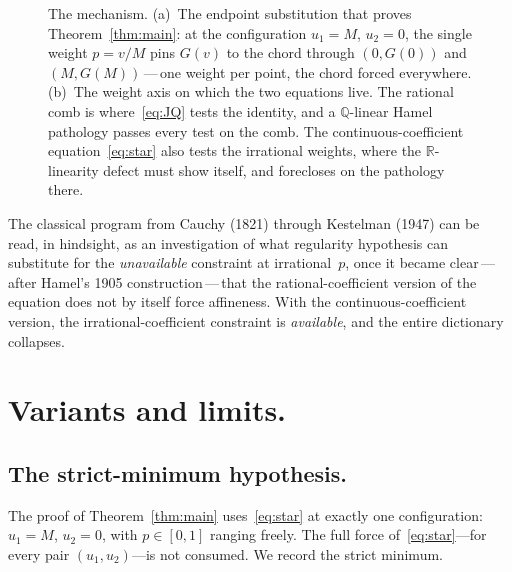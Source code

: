\documentclass{article}
\theoremstyle{plain}
\theoremstyle{definition}
\newcommand{\R}{\mathbb{R}}
\newcommand{\Q}{\mathbb{Q}}
\begin{document}
\begin{figure}[ht]
\caption{The mechanism. (a)~The endpoint substitution that proves
Theorem~\ref{thm:main}: at the configuration $u_1=M$, $u_2=0$, the
single weight $p=v/M$ pins $G(v)$ to the chord through $(0,G(0))$ and
$(M,G(M))$\,---\,one weight per point, the chord forced everywhere.
(b)~The weight axis on which the two equations live. The rational comb
is where~\eqref{eq:JQ} tests the identity, and a $\Q$-linear Hamel
pathology passes every test on the comb. The continuous-coefficient
equation~\eqref{eq:star} also tests the irrational weights, where the
$\R$-linearity defect must show itself, and forecloses on the
pathology there.}
\label{fig:mechanism}
\end{figure}

The classical program from Cauchy (1821) through Kestelman (1947)
can be read, in hindsight, as an investigation of what regularity
hypothesis can substitute for the \emph{unavailable} constraint at
irrational~$p$, once it became clear\,---\,after Hamel's 1905
construction\,---\,that the rational-coefficient version of the
equation does not by itself force affineness. With the
continuous-coefficient version, the irrational-coefficient constraint
is \emph{available}, and the entire dictionary collapses.

\section{Variants and limits.}
\label{sec:variants}

\subsection{The strict-minimum hypothesis.}
\label{ssec:weak}

The proof of Theorem~\ref{thm:main} uses~\eqref{eq:star} at exactly one
configuration: $u_1=M$, $u_2=0$, with $p\in[0,1]$ ranging freely. The
full force of~\eqref{eq:star}---for every pair $(u_1,u_2)$---is not
consumed. We record the strict minimum.
\end{document}
